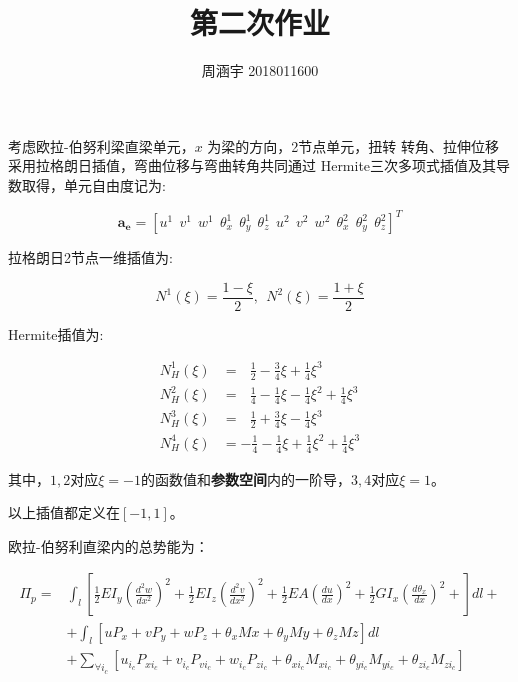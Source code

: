\documentclass[UTF8,c5size]{ctexart}
\title{{\bfseries 第二次作业}}
\author{周涵宇 2018011600}
\date{}
\begin{document}
\maketitle

考虑欧拉-伯努利梁直梁单元，$x$ 为梁的方向，2节点单元，扭转
转角、拉伸位移采用拉格朗日插值，弯曲位移与弯曲转角共同通过
Hermite三次多项式插值及其导数取得，单元自由度记为:

\begin{equation}
\bm{a_e}=[u^1\ \ v^1\ \ w^1\ \ \theta^1_x\ \ \theta^1_y\ \ \theta^1_z
\ \ u^2\ \ v^2\ \ w^2\ \ \theta^2_x\ \ \theta^2_y\ \ \theta^2_z]^T
\end{equation}

拉格朗日2节点一维插值为:

\begin{equation}
N^1(\xi) = \frac{1-\xi}{2},\ \ N^2(\xi) = \frac{1+\xi}{2}
\end{equation}

Hermite插值为:

\begin{equation}
\begin{split}
N^1_H(\xi)&=\ \ \ \frac{1}{2}-\frac{3}{4}\xi+\frac{1}{4}\xi^3\\
N^2_H(\xi)&=\ \ \ \frac{1}{4}-\frac{1}{4}\xi-\frac{1}{4}\xi^2+\frac{1}{4}\xi^3\\
N^3_H(\xi)&=\ \ \ \frac{1}{2}+\frac{3}{4}\xi-\frac{1}{4}\xi^3\\
N^4_H(\xi)&=-\frac{1}{4}-\frac{1}{4}\xi+\frac{1}{4}\xi^2+\frac{1}{4}\xi^3
\end{split}
\end{equation}

其中，$1,2$对应$\xi=-1$的函数值和{\bfseries 参数空间}内的一阶导，$3,4$对应$\xi=1$。

以上插值都定义在$[-1,1]$。

欧拉-伯努利直梁内的总势能为：

\begin{equation}
    \begin{split}
        \Pi_p=
            &\int_{l}{\left[
            \frac{1}{2}EI_y\left(\frac{d^2w}{dx^2}\right)^2+
            \frac{1}{2}EI_z\left(\frac{d^2v}{dx^2}\right)^2+
            \frac{1}{2}EA\left(\frac{du}{dx}\right)^2+
            \frac{1}{2}GI_x\left(\frac{d\theta_x}{dx}\right)^2+            
            \right]dl}+\\
            &+\int_{l}{\left[
                uP_x+vP_y+wP_z+\theta_xMx+\theta_yMy+\theta_zMz
                \right]dl}\\
            &+\sum_{\forall i_c}{\left[
            u_{i_c}P_{xi_c}+v_{i_c}P_{vi_c}+w_{i_c}P_{zi_c}
            +\theta_{xi_c}M_{xi_c}+\theta_{yi_c}M_{yi_c}+\theta_{zi_c}M_{zi_c}
            \right]}
    \end{split}
\end{equation}
\end{document}
